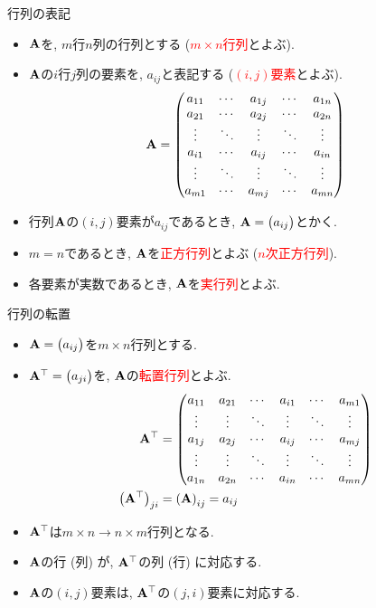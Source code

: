 \documentclass[dvipdfmx,notheorems,t]{beamer}
\begin{document}
\begin{frame}{行列の表記}
\begin{itemize}
  \item $\vb{A}$を, $m$行$n$列の行列とする (\textcolor{red}{$m \times n$行列}とよぶ).
  \item $\vb{A}$の$i$行$j$列の要素を, $a_{ij}$と表記する (\textcolor{red}{$(i, j)$要素}とよぶ).
  \begin{align*}
    \vb{A} = \mqty(a_{11} & \cdots & a_{1j} & \cdots & a_{1n} \\
      a_{21} & \cdots & a_{2j} & \cdots & a_{2n} \\
      \vdots & \ddots & \vdots & \ddots & \vdots \\
      a_{i1} & \cdots & a_{ij} & \cdots & a_{in} \\
      \vdots & \ddots & \vdots & \ddots & \vdots \\
      a_{m1} & \cdots & a_{mj} & \cdots & a_{mn})
  \end{align*}
  \item 行列$\vb{A}$の$(i, j)$要素が$a_{ij}$であるとき, $\vb{A} = \mqty(a_{ij})$とかく.
  \item $m = n$であるとき, $\vb{A}$を\textcolor{red}{正方行列}とよぶ (\textcolor{red}{$n$次正方行列}).
  \item 各要素が実数であるとき, $\vb{A}$を\textcolor{red}{実行列}とよぶ.
\end{itemize}
\end{frame}

\begin{frame}{行列の転置}
\begin{itemize}
  \item $\vb{A} = \mqty(a_{ij})$を$m \times n$行列とする.
  \item $\vb{A}^\top = \mqty(a_{ji})$を, $\vb{A}$の\textcolor{red}{転置行列}とよぶ.
  \begin{align*}
    \vb{A}^\top &= \mqty(a_{11} & a_{21} & \cdots & a_{i1} & \cdots & a_{m1} \\
      \vdots & \vdots & \ddots & \vdots & \ddots & \vdots \\
      a_{1j} & a_{2j} & \cdots & a_{ij} & \cdots & a_{mj} \\
      \vdots & \vdots & \ddots & \vdots & \ddots & \vdots \\
      a_{1n} & a_{2n} & \cdots & a_{in} & \cdots & a_{mn}) \\
    \left( \vb{A}^\top \right)_{ji} &= \left( \vb{A} \right)_{ij} = a_{ij}
  \end{align*}
  \item $\vb{A}^\top$は$m \times n \to n \times m$行列となる.
  \item $\vb{A}$の行 (列) が, $\vb{A}^\top$の列 (行) に対応する.
  \item $\vb{A}$の$(i, j)$要素は, $\vb{A}^\top$の$(j, i)$要素に対応する.
\end{itemize}
\end{frame}
\end{document}
